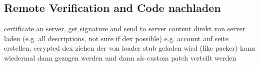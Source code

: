 \subsection{Remote Verification and Code nachladen}\label{subsection:external-remote}
certificate an server, get signature and send to server\newline
content direkt von server laden (e.g. all descriptions, not sure if dex possible)\newline
e.g. account auf seite erstellen, ecrypted dex ziehen der von loader stub geladen wird (like packer)
kann wiedermal dann gezogen werden und dann als custom patch verteilt werden\newline
